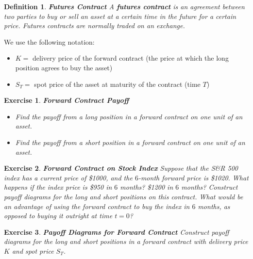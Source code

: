 \documentclass[letterpaper,10pt]{article}
\newtheorem{df}{Definition}[section]
\newtheorem{ex}{Exercise}
\begin{document}
\begin{df}{\bf Futures Contract}
A {\bf futures contract} is an agreement between two parties to buy or sell an asset at a certain time in the future for a certain price. Futures contracts are normally traded on an exchange.
\end{df}

\noindent We use the following notation:

\begin{itemize}

\item $K=$ delivery price of the forward contract (the price at which the long position agrees to buy the asset)

\item $S_T=$ spot price of the asset at maturity of the contract (time $T$)

\end{itemize}

\begin{ex}{\bf Forward Contract Payoff}


\begin{itemize}

\item Find the payoff from a long position in a forward contract on one unit of an asset.

\item Find the payoff from a short position in a forward contract on one unit of an asset.

\end{itemize}


\end{ex}


\begin{ex}{\bf Forward Contract on Stock Index}
Suppose that the S\&R 500 index has a current price of \$1000, and the $6$-month forward price is \$1020.  What happens if the index price is \$950 in $6$ months?  \$1200 in $6$ months?  Construct payoff diagrams for the long and short positions on this contract.  What would be an advantage of using the forward contract to buy the index in $6$ months, as opposed to buying it outright at time $t=0$?  
\end{ex}


\begin{ex}{\bf Payoff Diagrams for Forward Contract}
Construct payoff diagrams for the long and short positions in a forward contract with delivery price $K$ and spot price $S_T$.
\end{ex}
\end{document}
